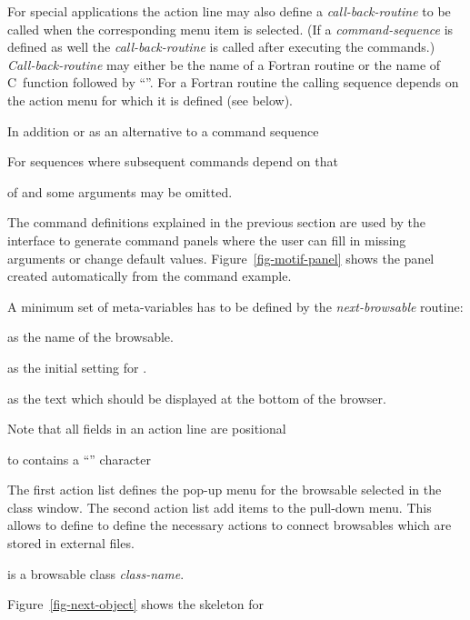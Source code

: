 For special applications the action line may also define a 
\textsl{call-back-routine} to be called when the corresponding menu item
is selected. 
(If a \textsl{command-sequence} is defined as well the \textsl{call-back-routine}
is called after executing the commands.)
\textsl{Call-back-routine} may either be the name of a Fortran routine or
the name of C~function followed by ``''.
For a Fortran routine the calling sequence depends on the
action menu for which it is defined (see below).



In addition or as an alternative to a command sequence 

For sequences where subsequent commands depend on that


 of and some arguments may be omitted.

The command definitions explained in the previous section are used by
the \KUIPMotif{} interface to generate command panels where the user can
fill in missing arguments or change default values.
Figure~\ref{fig-motif-panel} shows the panel created automatically
from the  command example.


A minimum set of meta-variables has to be defined by the 
\textsl{next-browsable} routine:
\begin{UL}
\item \Lit{[name]} as the name of the browsable.
\item \Lit{[root]} as the initial setting for \Lit{[path]}.
\item \Lit{[file]} as the text which should be displayed at the bottom
of the browser.
\end{UL}

Note that all fields in an action line are positional 

 to contains a ``\Lit{/}'' character 

The first action list defines the pop-up menu for the browsable selected
in the class window.
The second action list add items to the  pull-down menu.
This allows to define to define the necessary actions to connect
browsables which are stored in external files.

is a browsable class 
\textsl{class-name}.

Figure~\ref{fig-next-object} shows the skeleton for 
\fi

